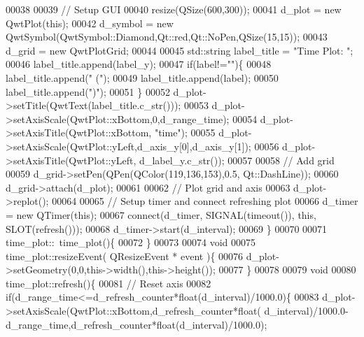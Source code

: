\begin{DoxyCode}
00038             
00039             \textcolor{comment}{// Setup GUI}
00040             resize(QSize(600,300));
00041             d_plot = \textcolor{keyword}{new} QwtPlot(\textcolor{keyword}{this});
00042             d_symbol = \textcolor{keyword}{new} QwtSymbol(QwtSymbol::Diamond,Qt::red,Qt::NoPen,QSize(15,15));
00043             d_grid = \textcolor{keyword}{new} QwtPlotGrid;
00044             
00045             std::string label\_title = \textcolor{stringliteral}{"Time Plot: "};
00046             label\_title.append(label\_y);
00047             \textcolor{keywordflow}{if}(label!=\textcolor{stringliteral}{""})\{
00048                 label\_title.append(\textcolor{stringliteral}{" ("});
00049                 label\_title.append(label);
00050                 label\_title.append(\textcolor{stringliteral}{")"});
00051             \}
00052             d_plot->setTitle(QwtText(label\_title.c\_str())); 
00053             d_plot->setAxisScale(QwtPlot::xBottom,0,d_range_time);
00054             d_plot->setAxisTitle(QwtPlot::xBottom, \textcolor{stringliteral}{"time"});
00055             d_plot->setAxisScale(QwtPlot::yLeft,d_axis_y[0],d_axis_y[1]);
00056             d_plot->setAxisTitle(QwtPlot::yLeft, d_label_y.c\_str());
00057             
00058             \textcolor{comment}{// Add grid}
00059             d_grid->setPen(QPen(QColor(119,136,153),0.5, Qt::DashLine));
00060             d_grid->attach(d_plot);
00061             
00062             \textcolor{comment}{// Plot grid and axis}
00063             d_plot->replot();
00064             
00065             \textcolor{comment}{// Setup timer and connect refreshing plot}
00066             d_timer = \textcolor{keyword}{new} QTimer(\textcolor{keyword}{this});
00067             connect(d_timer, SIGNAL(timeout()), \textcolor{keyword}{this}, SLOT(refresh()));
00068             d_timer->start(d_interval);
00069         \}
00070 
00071         time_plot::~time_plot()\{
00072         \}
00073         
00074         \textcolor{keywordtype}{void}
00075         time_plot::resizeEvent( QResizeEvent * event )\{
00076             d_plot->setGeometry(0,0,this->width(),this->height());
00077         \}
00078         
00079         \textcolor{keywordtype}{void}
00080         time_plot::refresh()\{
00081             \textcolor{comment}{// Reset axis}
00082             \textcolor{keywordflow}{if}(d_range_time<=d_refresh_counter*\textcolor{keywordtype}{float}(d_interval)/1000.0)\{
00083                 d_plot->setAxisScale(QwtPlot::xBottom,d_refresh_counter*\textcolor{keywordtype}{float}(
      d_interval)/1000.0-d_range_time,d_refresh_counter*\textcolor{keywordtype}{float}(d_interval)/1000.0);

\end{DoxyCode}
